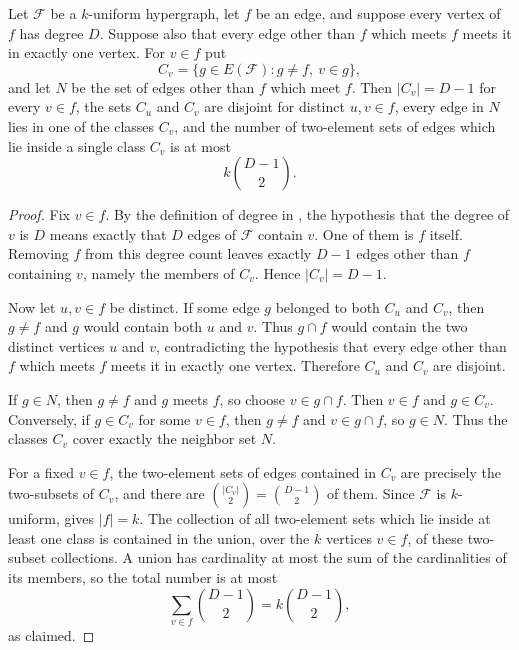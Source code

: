 \begin{helper}
Let $\mathcal F$ be a $k$-uniform hypergraph, let $f$ be an edge, and suppose
every vertex of $f$ has degree $D$.  Suppose also that every edge other than
$f$ which meets $f$ meets it in exactly one vertex.  For $v\in f$ put
\[
C_v=\{g\in E(\mathcal F):g\ne f,\ v\in g\},
\]
and let $N$ be the set of edges other than $f$ which meet $f$.  Then
$|C_v|=D-1$ for every $v\in f$, the sets $C_u$ and $C_v$ are disjoint for
distinct $u,v\in f$, every edge in $N$ lies in one of the classes $C_v$, and
the number of two-element sets of edges which lie inside a single class
$C_v$ is at most
\[
k\binom{D-1}{2}.
\]
\end{helper}
\begin{proof}
Fix $v\in f$.  By the definition of degree in
, the hypothesis that the degree of $v$ is $D$
means exactly that $D$ edges of $\mathcal F$ contain $v$.  One of them is
$f$ itself.  Removing $f$ from this degree count leaves exactly $D-1$ edges
other than $f$ containing $v$, namely the members of $C_v$.  Hence
$|C_v|=D-1$.

Now let $u,v\in f$ be distinct.  If some edge $g$ belonged to both $C_u$ and
$C_v$, then $g\ne f$ and $g$ would contain both $u$ and $v$.  Thus
$g\cap f$ would contain the two distinct vertices $u$ and $v$, contradicting
the hypothesis that every edge other than $f$ which meets $f$ meets it in
exactly one vertex.  Therefore $C_u$ and $C_v$ are disjoint.

If $g\in N$, then $g\ne f$ and $g$ meets $f$, so choose
$v\in g\cap f$.  Then $v\in f$ and $g\in C_v$.  Conversely, if
$g\in C_v$ for some $v\in f$, then $g\ne f$ and $v\in g\cap f$, so
$g\in N$.  Thus the classes $C_v$ cover exactly the neighbor set $N$.

For a fixed $v\in f$, the two-element sets of edges contained in $C_v$ are
precisely the two-subsets of $C_v$, and there are
$\binom{|C_v|}{2}=\binom{D-1}{2}$ of them.  Since $\mathcal F$ is
$k$-uniform,  gives $|f|=k$.  The collection of
all two-element sets which lie inside at least one class is contained in the
union, over the $k$ vertices $v\in f$, of these two-subset collections.  A
union has cardinality at most the sum of the cardinalities of its members, so
the total number is at most
\[
\sum_{v\in f}\binom{D-1}{2}=k\binom{D-1}{2},
\]
as claimed.
\end{proof}

